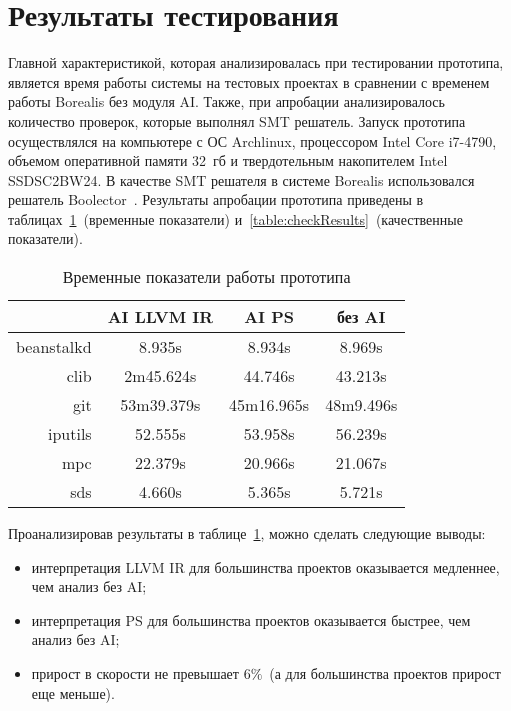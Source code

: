 \section{Результаты тестирования}
Главной характеристикой, которая анализировалась при тестировании прототипа, 
является время работы системы на тестовых проектах в сравнении с временем
работы Borealis без модуля AI. Также, при апробации анализировалось количество 
проверок, которые выполнял SMT решатель. Запуск прототипа осуществлялся на 
компьютере с ОС Archlinux, процессором Intel Core i7-4790, объемом оперативной 
памяти 32~гб и твердотельным накопителем Intel SSDSC2BW24. В качестве SMT 
решателя в системе Borealis использовался решатель Boolector~\cite{boolector}. 
Результаты апробации прототипа приведены в 
таблицах~\ref{table:timeResults}~(временные показатели) 
и~\ref{table:checkResults}~(качественные показатели).
\begin{table}
\caption{Временные показатели работы прототипа}
\centering
\begin{tabular}{|r|c|c|c|}
\hline
           & AI LLVM IR   & AI PS        & без AI    \\ \hline
beanstalkd & 8.935s       & 8.934s       & 8.969s    \\ \hline
clib       & 2m45.624s    & 44.746s      & 43.213s   \\ \hline
git        & 53m39.379s   & 45m16.965s   & 48m9.496s \\ \hline
iputils    & 52.555s      & 53.958s      & 56.239s   \\ \hline
mpc        & 22.379s      & 20.966s      & 21.067s   \\ \hline
sds        & 4.660s       & 5.365s       & 5.721s    \\ \hline
\end{tabular}
\label{table:timeResults}
\end{table}

Проанализировав результаты в таблице~\ref{table:timeResults}, можно сделать 
следующие выводы:
\begin{itemize}
\item интерпретация LLVM IR для большинства проектов оказывается медленнее, чем
анализ без AI;
\item интерпретация PS для большинства проектов оказывается быстрее, чем анализ
без AI;
\item прирост в скорости не превышает $6\%$~(а для большинства проектов прирост
еще меньше).
\end{itemize}

